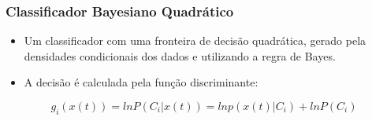 \documentclass{beamer}
\begin{document}
\begin{frame}
\frametitle{Classificador Bayesiano Quadrático}
\begin{itemize} 
\item Um classificador com uma fronteira de decisão quadrática, gerado pela densidades condicionais dos dados e utilizando a regra de Bayes.
\item A decisão é calculada pela função discriminante:
\end{itemize}

\begin{theorem}
\[ g_i(x(t))= ln P(C_i|x(t))= ln p(x(t)|C_i)+ ln P(C_i)\]

\end{theorem}

\end{frame}
\end{document}
